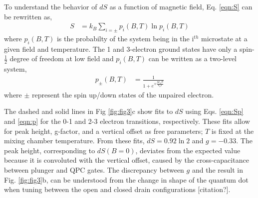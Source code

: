 \documentclass[twocolumn,showpacs,preprintnumbers,amsmath,amssymb,pra,aps,superscriptaddress]{revtex4-1}
\begin{document}
To understand the behavior of $dS$ as a function of magnetic field, Eq. \ref{eqn:S} can be rewritten as,
%
\begin{align}
\label{eqn:Sp}
        S &= k_B \sum_{i=\pm} p_{i}(B, T) \ln{ p_{i}(B,T) }
\end{align}
%
where $p_{i}(B, T)$ is the probabilty of the system being in the i$^{th}$ microstate at a given field and temperature. The 1 and 3-electron ground states have only a spin-$\frac{1}{2}$ degree of freedom at low field and $p_{i}(B, T)$ can be written as a two-level system,
%
\begin{align}
\label{eqn:p}
        p_{\pm}(B, T) &= \frac{1}{1+ e^{\mp \frac{g\mu_B B}{k_B T}}}
\end{align}
%
where $\pm$ represent the spin up/down states of the unpaired electron.

The dashed and solid lines in Fig \ref{fig:fig3}c show fits to $dS$ using Eqs. \ref{eqn:Sp} and \ref{eqn:p} for the 0-1 and 2-3 electron transitions, respectively. These fits allow for peak height, g-factor, and a vertical offset as free parameters; $T$ is fixed at the mixing chamber temperature. From these fits, $dS=0.92 \ln{2}$ and $g=-0.33$. The peak height, corresponding to $dS(B=0)$, deviates from the expected value because it is convoluted with the vertical offset, caused by the cross-capacitance between plunger and QPC gates. The discrepancy between $g$ and the result in Fig. \ref{fig:fig3}b, can be understood from the change in shape of the quantum dot when tuning between the open and closed drain configurations [citation?].
\end{document}

